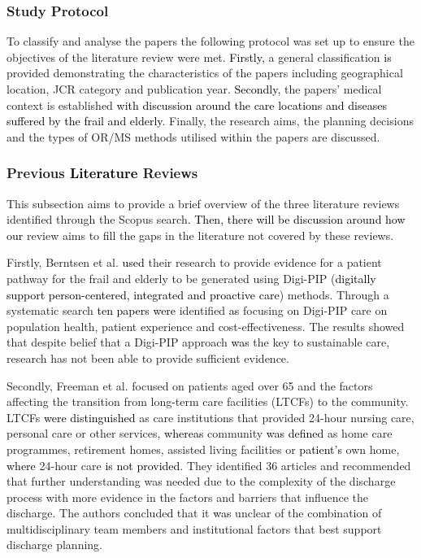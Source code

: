 \documentclass[../thesis.tex]{subfiles}
\begin{document}
\subsubsection{Study Protocol}
To classify and analyse the papers the following protocol was set up to ensure the objectives of the literature review were met. \textcolor{black}{Firstly,} a general classification \textcolor{black}{is} provided demonstrating the characteristics of the papers including geographical location, JCR category and publication year. \textcolor{black}{Secondly,} the papers' medical context is established \textcolor{black}{with discussion around the care locations and diseases suffered by the frail and elderly}. Finally, the research aims, the planning decisions and the types of OR/MS methods utilised within the papers are discussed.

\subsubsection{Previous \textcolor{black}{Literature} Reviews}\label{subsection:pr}
This subsection aims to provide a brief overview of the three literature reviews identified through the Scopus search\textcolor{black}{. Then, there will be discussion around how our} review aims to fill the gaps in the literature not covered by these reviews.

Firstly, Berntsen et al. \cite{Berntsen} \textcolor{black}{used} their research to provide evidence for a patient pathway for the frail and elderly to be generated using Digi-PIP (\textcolor{black}{digitally support person-centered, integrated and proactive care}) methods. Through a systematic search \textcolor{black}{ten papers were} identified \textcolor{black}{as} focusing on Digi-PIP care on population health, patient experience and cost-effectiveness. The results showed that despite belief that a Digi-PIP approach \textcolor{black}{was} the key to sustainable care, research has not been able to provide sufficient evidence.

Secondly, Freeman et al. \cite{Freeman} focused on patients aged over 65 and the factors affecting the transition from long\textcolor{black}{-}term care facilities (LTCFs) to the community. LTCFs \textcolor{black}{were distinguished} as care institutions that provided 24-hour nursing care, personal care or other services, \textcolor{black}{whereas} community \textcolor{black}{was defined} as home care programmes, retirement homes, assisted living facilities or \textcolor{black}{patient's} own home, \textcolor{black}{where} 24-hour care \textcolor{black}{is not provided}. They identified 36 articles and recommended that further understanding was needed due to the complexity of the discharge process with more evidence in the factors and barriers that influence the discharge. The authors conclude\textcolor{black}{d} that it \textcolor{black}{was} unclear of the combination of multidisciplinary team members and institutional factors that best support discharge planning.
\end{document}
